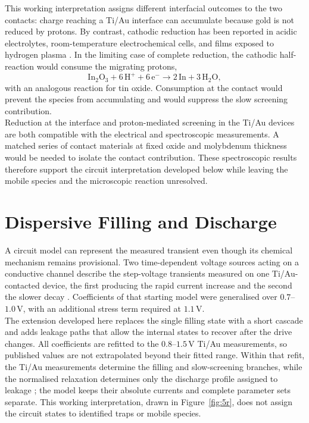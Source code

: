 \noindent This working interpretation assigns different interfacial outcomes to the two contacts: charge reaching a
Ti/Au interface can accumulate because gold is not reduced by protons. By contrast, cathodic  reduction
has been reported in acidic electrolytes, room-temperature electrochemical cells, and films exposed to hydrogen
plasma \cite{ciocci2021differentiating, senthilkumar2008electrochemical, wang2003optical, banerjee1987degradation,
huang2003electrochemical, liu2015important}. In the limiting case of complete reduction, the cathodic half-reaction
would consume the migrating protons,
\begin{equation}
    \mathrm{In_2O_3 + 6\,H^+ + 6\,e^- \rightarrow 2\,In + 3\,H_2O}, \label{eq:5.redox}
\end{equation}
with an analogous reaction for tin oxide. Consumption at the contact would prevent the species from accumulating and
would suppress the slow screening contribution.\\

\noindent Reduction at the  interface and proton-mediated screening in the Ti/Au devices are both
compatible with the electrical and spectroscopic measurements. A matched series of
contact materials at fixed oxide and molybdenum thickness would be needed to isolate the contact contribution. These
spectroscopic results therefore support the circuit interpretation developed below while leaving the mobile species
and the microscopic reaction unresolved.

\section[Dispersive Filling and Discharge]{Dispersive Filling and Discharge}\label{sec:5p-model}

\noindent A circuit model can represent the measured transient even though its chemical mechanism remains
provisional. Two time-dependent voltage sources acting on a conductive channel describe the step-voltage transients
measured on one Ti/Au-contacted device, the first producing the rapid current increase and the second the slower
decay \cite{mannion2023compact}. Coefficients of that starting model were generalised over $0.7$--$1.0$\,V, with an
additional stress term required at $1.1$\,V.\\

\noindent The extension developed here replaces the single filling state with a short cascade and adds leakage paths
that allow the internal states to recover after the drive changes. All coefficients are refitted to the
$0.8$--$1.5$\,V Ti/Au measurements, so published values are not extrapolated beyond their fitted range. Within that
refit, the Ti/Au measurements determine the filling and slow-screening branches, while the normalised
 relaxation determines only the discharge profile assigned to leakage \cite{woo2024localized}; the model
keeps their absolute currents and complete parameter sets separate. This working interpretation, drawn in
Figure~\ref{fig:5r}, does not assign the circuit states to identified traps or mobile species.

